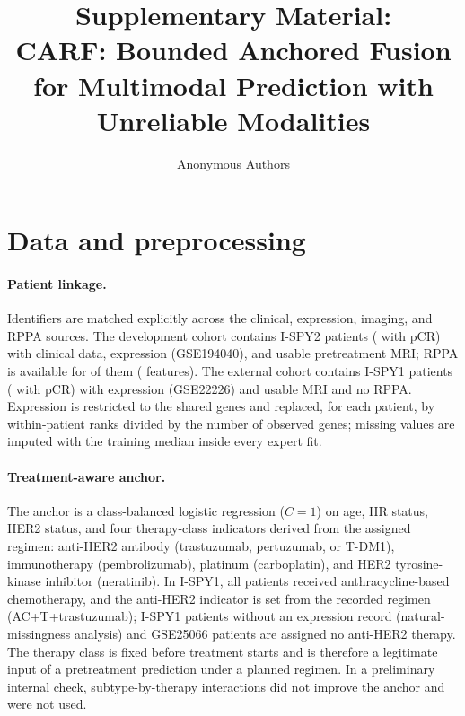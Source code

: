 \documentclass[a4paper,runningheads]{llncs}
\begin{document}
\title{Supplementary Material:\\ CARF: Bounded Anchored Fusion for Multimodal Prediction with Unreliable Modalities}
\author{Anonymous Authors}
\maketitle

\setcounter{section}{0}
\renewcommand{\thesection}{S\arabic{section}}
\renewcommand{\thetable}{S\arabic{table}}
\renewcommand{\thefigure}{S\arabic{figure}}

\section{Data and preprocessing}

\paragraph{Patient linkage.} Identifiers are matched explicitly across the clinical, expression, imaging, and RPPA sources. The development cohort contains \NDev{} I-SPY2 patients (\NDevPos{} with pCR) with clinical data, expression (GSE194040), and usable pretreatment MRI; RPPA \cite{wolf2022ispy} is available for \NRppa{} of them (\NRppaFeat{} features). The external cohort contains \NExt{} I-SPY1 patients (\NExtPos{} with pCR) with expression (GSE22226) and usable MRI and no RPPA. Expression is restricted to the \NGenes{} shared genes and replaced, for each patient, by within-patient ranks divided by the number of observed genes; missing values are imputed with the training median inside every expert fit.

\paragraph{Treatment-aware anchor.} The anchor is a class-balanced logistic regression ($C=1$) on age, HR status, HER2 status, and four therapy-class indicators derived from the assigned regimen: anti-HER2 antibody (trastuzumab, pertuzumab, or T-DM1), immunotherapy (pembrolizumab), platinum (carboplatin), and HER2 tyrosine-kinase inhibitor (neratinib). In I-SPY1, all patients received anthracycline-based chemotherapy, and the anti-HER2 indicator is set from the recorded regimen (AC+T+trastuzumab); I-SPY1 patients without an expression record (natural-missingness analysis) and GSE25066 patients are assigned no anti-HER2 therapy. The therapy class is fixed before treatment starts and is therefore a legitimate input of a pretreatment prediction under a planned regimen. In a preliminary internal check, subtype-by-therapy interactions did not improve the anchor and were not used.
\end{document}
